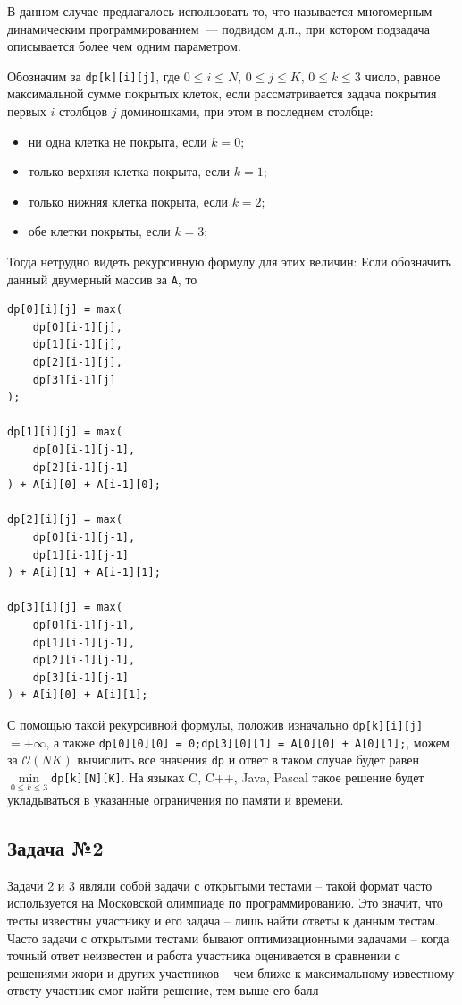 \documentclass[a4paper]{article}
\begin{document}
В данном случае предлагалось использовать то, что называется многомерным динамическим программированием~--- подвидом д.п., при котором подзадача описывается более чем одним параметром.

Обозначим за \texttt{dp[k][i][j]}, где $0 \leq i \leq N$, $0 \leq j \leq K$, $0 \leq k \leq 3$ число, равное максимальной сумме покрытых клеток, если рассматривается задача покрытия первых $i$ столбцов $j$ доминошками, при этом в последнем столбце:
\begin{itemize} 
    \item ни одна клетка не покрыта, если $k = 0$;
    \item только верхняя клетка покрыта, если $k = 1$;
    \item только нижняя клетка покрыта, если $k = 2$;
    \item обе клетки покрыты, если $k = 3$;
\end{itemize} 

Тогда нетрудно видеть рекурсивную формулу для этих величин: Если обозначить данный двумерный массив за \texttt{A}, то 

\begin{lstlisting}
dp[0][i][j] = max(
    dp[0][i-1][j],
    dp[1][i-1][j],
    dp[2][i-1][j],
    dp[3][i-1][j]
);

dp[1][i][j] = max(
    dp[0][i-1][j-1],
    dp[2][i-1][j-1]
) + A[i][0] + A[i-1][0];

dp[2][i][j] = max(
    dp[0][i-1][j-1],
    dp[1][i-1][j-1]
) + A[i][1] + A[i-1][1];

dp[3][i][j] = max(
    dp[0][i-1][j-1],
    dp[1][i-1][j-1],
    dp[2][i-1][j-1],
    dp[3][i-1][j-1]
) + A[i][0] + A[i][1];
\end{lstlisting}

С помощью такой рекурсивной формулы, положив изначально \texttt{dp[k][i][j]}$=+\infty$, а также     \texttt{dp[0][0][0] = 0;}\texttt{dp[3][0][1] = A[0][0] + A[0][1];}, можем за $\mathcal O(NK)$ вычислить все значения \texttt{dp} и ответ в таком случае будет равен $\min\limits_{0 \leq k \leq 3}$\texttt{dp[k][N][K]}. На языках C, C++, Java, Pascal такое решение будет укладываться в указанные ограничения по памяти и времени.




\newpage
\subsection{Задача №2}
Задачи 2 и 3 являли собой задачи с открытыми тестами -- такой формат часто используется на Московской олимпиаде по программированию. Это значит, что тесты известны участнику и его задача -- лишь найти ответы к данным тестам. Часто задачи с открытыми тестами бывают оптимизационными задачами -- когда точный ответ неизвестен и работа участника оценивается в сравнении с решениями жюри и других участников -- чем ближе к максимальному известному ответу участник смог найти решение, тем выше его балл
\end{document}
